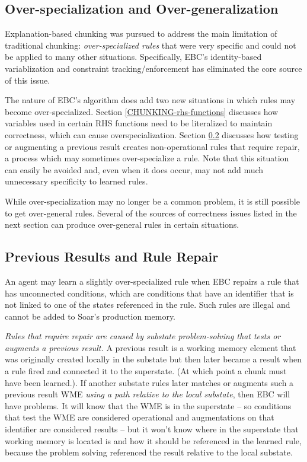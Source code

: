 \subsection{Over-specialization and Over-generalization}
\label{CHUNKING-overspecialization}

Explanation-based chunking was pursued to address the main limitation of traditional chunking:  \textit{over-specialized rules} that were very specific and could not be applied to many other situations. Specifically, EBC's identity-based variablization and constraint tracking/enforcement has eliminated the core source of this issue.

The nature of EBC's algorithm does add two new situations in which rules may become over-specialized.  Section \ref{CHUNKING-rhs-functions} discusses how variables used in certain RHS functions need to be literalized to maintain correctness, which can cause overspecialization. Section \ref{CHUNKING-rule-repair} discusses how testing or augmenting a previous result creates non-operational rules that require repair, a process which may sometimes over-specialize a rule.  Note that this situation can easily be avoided and, even when it does occur, may not add much unnecessary specificity to learned rules. 

While over-specialization may no longer be a common problem, it is still possible to get over-general rules.  Several of the sources of correctness issues listed in the next section can produce over-general rules in certain situations.

\subsection{Previous Results and Rule Repair}
\label{CHUNKING-rule-repair}

An agent may learn a slightly over-specialized rule when EBC repairs a rule that has unconnected conditions, which are conditions that have an identifier that is not linked to one of the states referenced in the rule.  Such rules are illegal and cannot be added to Soar's production memory. 

\textit{Rules that require repair are caused by substate problem-solving that tests or augments a previous result.}  A previous result is a working memory element that was originally created locally in the substate but then later became a result when a rule fired and connected it to the superstate.  (At which point a chunk must have been learned.). If another substate rules later matches or augments such a previous result WME \emph{using a path relative to the local substate}, then EBC will have problems.  It will know that the WME is in the superstate -- so conditions that test the WME are considered operational and augmentations on that identifier are considered results -- but it won't know where in the superstate that working memory is located is and how it should be referenced in the learned rule, because the problem solving referenced the result relative to the local substate.

